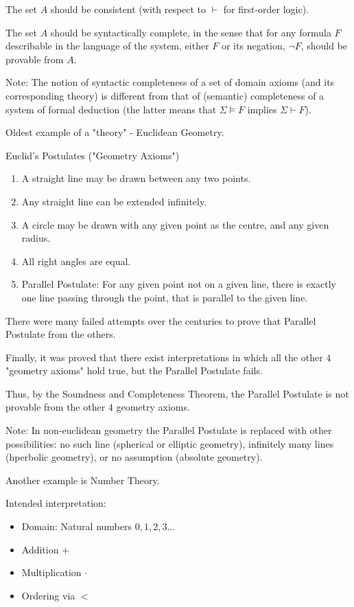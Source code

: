 \documentclass{article}
\begin{document}
The set $A$ should be consistent (with respect to $\vdash$ for first-order logic).

The set $A$ should be syntactically complete, in the sense that for any formula $F$ describable in the language of the system, either $F$ or its negation, $\neg F$, should be provable from $A$.

Note: The notion of syntactic completeness of a set of domain axioms (and its corresponding theory) is different from that of (semantic) completeness of a system of formal deduction (the latter means that $\Sigma \vDash F$ implies $\Sigma \vdash F$).

Oldest example of a "theory" - Euclidean Geometry.

Euclid's Postulates ("Geometry Axioms")
\begin{enumerate}
    \item A straight line may be drawn between any two points.
    \item Any straight line can be extended infinitely.
    \item A circle may be drawn with any given point as the centre, and any given radius.
    \item All right angles are equal.
    \item Parallel Postulate: For any given point not on a given line, there is exactly one line passing through the point, that is parallel to the given line.
\end{enumerate}

There were many failed attempts over the centuries to prove that Parallel Postulate from the others.

Finally, it was proved that there exist interpretations in which all the other $4$ "geometry axioms" hold true, but the Parallel Postulate fails.

Thus, by the Soundness and Completeness Theorem, the Parallel Postulate is not provable from the other $4$ geometry axioms.

Note: In non-euclidean geometry the Parallel Postulate is replaced with other possibilities: no such line (spherical or elliptic geometry), infinitely many lines (hperbolic geometry), or no assumption (absolute geometry).

Another example is Number Theory.

Intended interpretation:
\begin{itemize}
    \item Domain: Natural numbers $0, 1, 2, 3 \ldots$
    \item Addition $+$
    \item Multiplication $\cdot$
    \item Ordering via $<$
\end{itemize}
\end{document}
